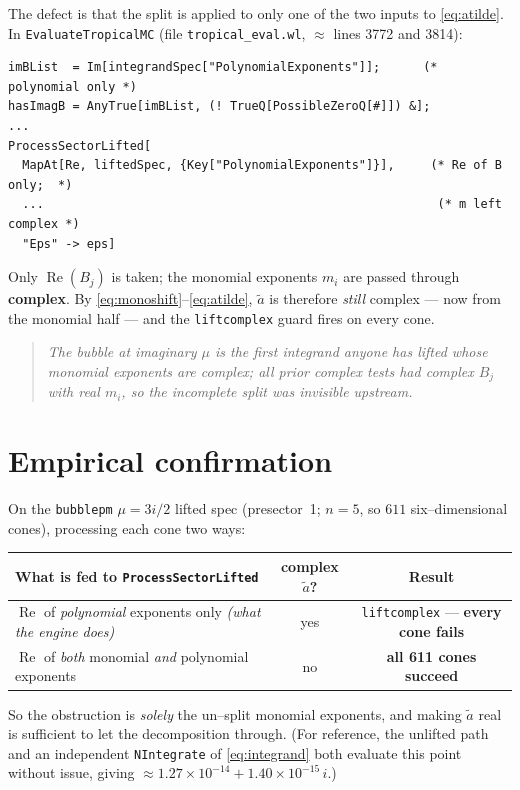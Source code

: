 \documentclass[11pt]{article}
\newcommand{\Real}{\operatorname{Re}}
\newcommand{\atil}{\tilde{a}}
\newcommand{\code}[1]{\texttt{#1}}
\begin{document}
The defect is that the split is applied to only one of the two inputs to
\eqref{eq:atilde}. In \code{EvaluateTropicalMC} (file \code{tropical\_eval.wl},
$\approx$ lines 3772 and 3814):
\begin{lstlisting}
imBList  = Im[integrandSpec["PolynomialExponents"]];      (* polynomial only *)
hasImagB = AnyTrue[imBList, (! TrueQ[PossibleZeroQ[#]]) &];
...
ProcessSectorLifted[
  MapAt[Re, liftedSpec, {Key["PolynomialExponents"]}],     (* Re of B only;  *)
  ...                                                       (* m left complex *)
  "Eps" -> eps]
\end{lstlisting}
Only $\Real(B_j)$ is taken; the monomial exponents $m_i$ are passed through
\textbf{complex}. By \eqref{eq:monoshift}--\eqref{eq:atilde}, $\atil$ is therefore
\emph{still} complex --- now from the monomial half --- and the \code{liftcomplex}
guard fires on every cone.

\begin{quote}\itshape
The bubble at imaginary $\mu$ is the first integrand anyone has lifted whose
\emph{monomial} exponents are complex; all prior complex tests had complex $B_j$ with
real $m_i$, so the incomplete split was invisible upstream.
\end{quote}

\section{Empirical confirmation}

On the \code{bubblepm} $\mu=3i/2$ lifted spec (presector~1; $n{=}5$, so $611$
six--dimensional cones), processing each cone two ways:

\begin{center}
\begin{tabular}{lcc}
\toprule
What is fed to \code{ProcessSectorLifted} & complex $\atil$? & Result \\
\midrule
$\Real$ of \emph{polynomial} exponents only \emph{(what the engine does)} & yes & \code{liftcomplex} --- \textbf{every cone fails} \\
$\Real$ of \emph{both} monomial \emph{and} polynomial exponents & no & \textbf{all 611 cones succeed} \\
\bottomrule
\end{tabular}
\end{center}

\noindent So the obstruction is \emph{solely} the un--split monomial exponents, and
making $\atil$ real is sufficient to let the decomposition through. (For reference,
the unlifted path and an independent \code{NIntegrate} of \eqref{eq:integrand} both
evaluate this point without issue, giving $\approx 1.27\times10^{-14} +
1.40\times10^{-15}\,i$.)
\end{document}
